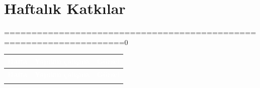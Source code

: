 \documentclass[12pt,a4paper]{article}
\begin{document}
\section{Haftalık Katkılar}
====================================================================0
\begin{longtable}{@{}>{\raggedright\arraybackslash}p{1.7cm}%
                    >{\raggedright\arraybackslash}p{6.4cm}%
                    >{\centering\arraybackslash}p{6cm}@{}}
\toprule
\rowcolor{ana}\textcolor{white}{\textbf{Hafta}} & \textcolor{white}{\textbf{Yapılan çalışma}} & \textcolor{white}{\textbf{Görsel}} \\
\midrule
\endfirsthead
\toprule
\rowcolor{ana}\textcolor{white}{\textbf{Hafta}} & \textcolor{white}{\textbf{Yapılan çalışma}} & \textcolor{white}{\textbf{Görsel}} \\
\midrule
\endhead
\bottomrule
\endfoot


\end{longtable}
\end{document}
